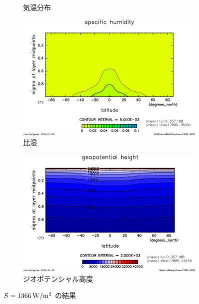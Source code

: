 \documentclass[body]{subfiles}
\begin{document}
\begin{figure}[t]
\begin{subfigure}{.4\textwidth}
		\caption{気温分布}
	\end{subfigure}
	\begin{subfigure}{.4\textwidth}
		\centering
		\includegraphics[width=\columnwidth]{S1366/QH2OVap,time=17885:18250-crop-rotate.pdf}
		\caption{比湿}
	\end{subfigure}
	\begin{subfigure}{.4\textwidth}
		\centering
		\includegraphics[width=\columnwidth]{S1366/Height,time=17885:18250-crop-rotate.pdf}
		\caption{ジオポテンシャル高度}
	\end{subfigure}
	\caption{
		\(S=1366\hmu{W/m^2}\) の結果
	}
\end{figure}
\end{document}
